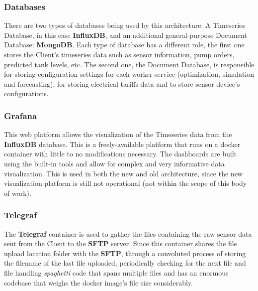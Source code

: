 \subsubsection{Databases}
\label{methodology:sss:databases}

There are two types of databases being used by this architecture: A Timeseries Database, in this case \textbf{InfluxDB}, and an additional general-purpose Document Database: \textbf{MongoDB}. Each type of database has a different role, the first one stores the Client's timeseries data such as sensor information, pump orders, predicted tank levels, etc.
The second one, the Document Database, is responsible for storing configuration settings for each worker service (optimization, simulation and forecasting), for storing electrical tariffs data and to store sensor device's configurations.

\subsubsection{Grafana}
\label{methodology:sss:grafana}

This web platform allows the visualization of the Timeseries data from the \textbf{InfluxDB} database. This is a freely-available platform that runs on a docker container with little to no modifications necessary. The dashboards are built using the built-in tools and allow for complex and very informative data visualization. This is used in both the new and old architecture, since the new visualization platform is still not operational (not within the scope of this body of work).

\subsubsection{Telegraf}
\label{methodology:sss:telegraf}

The \textbf{Telegraf} container is used to gather the files containing the raw sensor data sent from the Client to the \textbf{SFTP} server. Since this container shares the file upload location folder with the \textbf{SFTP}, through a convoluted process of storing the filename of the last file uploaded, periodically checking for the next file and file handling \textit{spaghetti} code that spans multiple files and has an enormous codebase that weighs the docker image's file size considerably. 